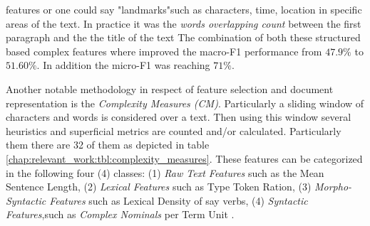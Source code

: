features or one could say "landmarks"such as characters, time, location in specific areas of the text. In practice it was the \textit{words overlapping count} between the first paragraph and the the title of the text The combination of both these structured based complex features where improved the macro-F1 performance from $47.9\%$ to $51.60\%$. In addition the micro-F1 was reaching $71\%$. 

Another notable methodology in respect of  feature selection and document representation is the \textit{Complexity Measures (CM)}.  Particularly a sliding window of characters and words is considered over a text. Then using this window several heuristics and superficial metrics are counted and/or calculated. Particularly them there are 32 of them as depicted in table \ref{chap:relevant_work:tbl:complexity_measures}. These features can be categorized in the following four (4) classes: (1) \textit{Raw Text Features} such as the Mean Sentence Length, (2) \textit{Lexical Features} such as Type Token Ration, (3) \textit{Morpho-Syntactic Features} such as Lexical Density of say verbs, (4) \textit{Syntactic Features},such as \textit{Complex Nominals} per Term Unit \parencite{strobel2018text}.

